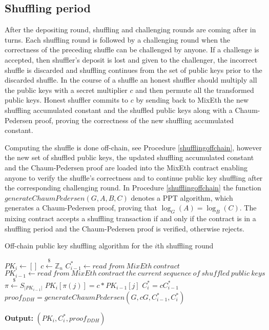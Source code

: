 \documentclass[a4paper]{article}
\theoremstyle{definition}
\begin{document}
\subsection{Shuffling period}
After the depositing round, shuffling and challenging rounds are coming after in turns. Each shuffling round is followed by a challenging round when the correctness of the preceding shuffle can be challenged by anyone. If a challenge is accepted, then shuffler's deposit is lost and given to the challenger, the incorrect shuffle is discarded and shuffling continues from the set of public keys prior to the discarded shuffle. In the course of a shuffle an honest shuffler should multiply all the public keys with a secret multiplier $c$ and then permute all the transformed public keys. Honest shuffler commits to $c$ by sending back to MixEth the new shuffling accumulated constant and the shuffled public keys along with a Chaum-Pedersen proof, proving the correctness of the new shuffling accumulated constant.

Computing the shuffle is done off-chain, see Procedure \ref{shufflingoffchain}, however the new set of shuffled public keys, the updated shuffling accumulated constant and the Chaum-Pedersen proof are loaded into the MixEth contract enabling anyone to verify the shuffle's correctness and to continue public key shuffling after the corresponding challenging round. In Procedure \ref{shufflingoffchain} the function $generateChaumPedersen(G,A,B,C)$ denotes a PPT algorithm, which generates a Chaum-Pedersen proof, proving that $\log_{G}(A)=\log_{B}(C)$.  The mixing contract accepts a shuffling transaction if and only if the contract is in a shuffling period and the Chaum-Pedersen proof is verified, otherwise rejects.

\begin{algorithm}
\caption{Off-chain public key shuffling algorithm for the $i$th shuffling round}\label{shufflingoffchain}
\begin{algorithmic}[1]
	\State $PK_{i} \gets []$
	\State $c\stackrel{\$}{\leftarrow}\mathbb{Z}_n$
	\State $C^{*}_{i-1}\leftarrow read\ from\ MixEth\ contract$
	\State $PK_{i-1}\leftarrow read\ from\ MixEth\ contract\ the\ current\ sequence\ of\ shuffled\ public\ keys$
	\State $\pi\stackrel{\$}{\leftarrow}S_{|PK_{i-1}|}$ 
	\State $PK_{i}[\pi(j)]=c*PK_{i-1}[j]$ 
	\EndFor
	\State $C^{*}_{i}=cC^{*}_{i-1}$
	\State $proof_{DDH}=generateChaumPedersen(G,cG,C^{*}_{i-1},C^{*}_{i})$
	
\hspace*{\algorithmicindent} \textbf{Output:} $(PK_{i},C^{*}_{i},proof_{DDH})$ 
\end{algorithmic}   
\end{algorithm}
\end{document}
